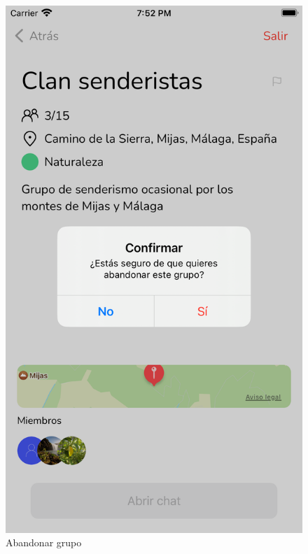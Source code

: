 \begin{appendices}
\begin{figure}[H]
\begin{minipage}{0.3\textwidth}
        \end{minipage}
        \begin{minipage}{0.3\textwidth}
            \centering
            \includegraphics[cframe=black 2pt,width=1\linewidth]{images/manual/confirmarAbandono.png}
        \end{minipage}
        \caption{Abandonar grupo}
        \label{fig:leave_group}
\end{figure}


\end{appendices}
